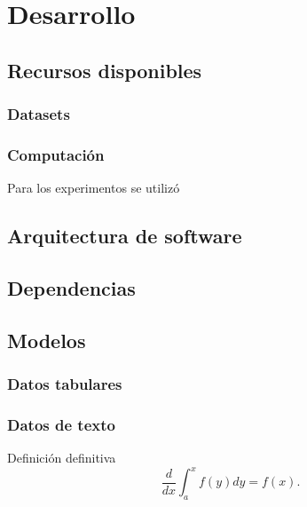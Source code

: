 \chapter{Desarrollo}
\section{Recursos disponibles}
\subsection{Datasets}
\subsection{Computación}
Para los experimentos se utilizó  
\section{Arquitectura de software}
\section{Dependencias}
\section{Modelos}
\subsection{Datos tabulares}
\subsection{Datos de texto}
\lipsum[1-3]
\begin{defn} Definición definitiva $$\frac{d}{dx}\int_a^xf(y)dy=f(x).$$\end{defn}